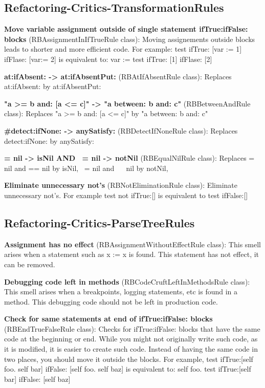 \subsection{Refactoring-Critics-TransformationRules}
\textbf{Move variable assignment outside of single statement ifTrue:ifFalse: blocks} (RBAssignmentInIfTrueRule class): Moving assignements outside blocks leads to shorter and more efficient code.
For example:
test 
	ifTrue: [var := 1]
	ifFlase: [var:= 2]
is equivalent to:
var :=  test 
	ifTrue: [1]
	ifFlase: [2]

\textbf{at:ifAbsent: -> at:ifAbsentPut:} (RBAtIfAbsentRule class):  Replaces at:ifAbsent: by at:ifAbsentPut:

\textbf{"a >= b and: [a <= c]" -> "a between: b and: c"} (RBBetweenAndRule class):  Replaces "a >= b and: [a <= c]" by "a between: b and: c"

\textbf{#detect:ifNone: -> anySatisfy:} (RBDetectIfNoneRule class): Replaces detect:ifNone: by anySatisfy:

\textbf{= nil -> isNil AND ~= nil -> notNil} (RBEqualNilRule class): Replaces = nil and == nil by isNil, ~= nil and ~~ nil by notNil, 

\textbf{Eliminate unnecessary not's} (RBNotEliminationRule class): Eliminate unnecessary not's.
For example test not ifTrue:[] is equivalent to test ifFalse:[]

\subsection{Refactoring-Critics-ParseTreeRules}
\textbf{Assignment has no effect} (RBAssignmentWithoutEffectRule class): This smell arises when a statement such as x := x is found. This statement has not effect, it can be removed.

\textbf{Debugging code left in methods} (RBCodeCruftLeftInMethodsRule class): This smell arises when a breakpoints, logging statements, etc is found in a method. This debugging code should not be left in production code.

\textbf{Check for same statements at end of ifTrue:ifFalse: blocks} (RBEndTrueFalseRule class): Checks for ifTrue:ifFalse: blocks that have the same code at the beginning or end. While you might not originally write such code, as it is modified, it is easier to create such code. Instead of having the same code in two places, you should move it outside the blocks.
For example, 
test 
	ifTrue:[self foo. self bar] 
	ifFalse: [self foo. self baz]
 is equivalent to: 
self foo.  
test 
	ifTrue:[self bar] 
	ifFalse: [self baz]

